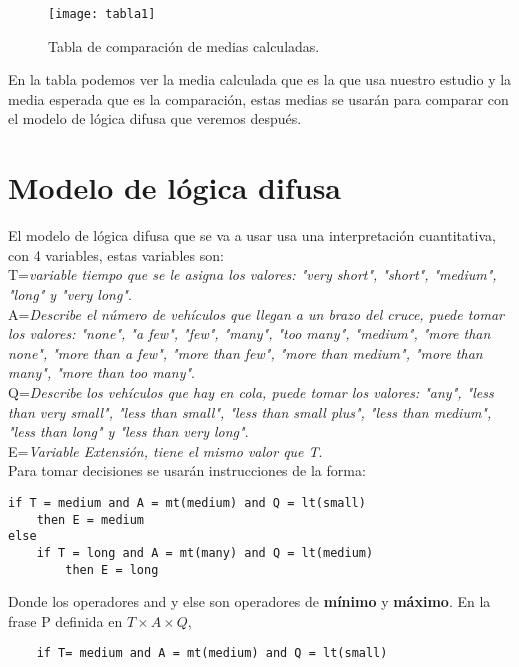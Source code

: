 \begin{figure}[H]
	\texttt{[image: tabla1]}
	\centering
	\caption{Tabla de comparación de medias calculadas.}
	\label{fig:mesh1}
\end{figure}

En la tabla podemos ver la media calculada que es la que usa nuestro estudio y la media esperada que es la comparación, estas medias se usarán para comparar con el modelo de lógica difusa que veremos después.\\

\newpage
\section{Modelo de lógica difusa}

El modelo de lógica difusa que se va a usar usa una interpretación cuantitativa, con 4 variables, estas variables son:\\

T=\textit{variable tiempo que se le asigna los valores: "very short", "short", "medium", "long" y "very long"}.\\

A=\textit{Describe el número de vehículos que llegan a un brazo del cruce, puede tomar los valores: "none", "{a few}", "few", "many", "too many", "medium", "more than none", "more than a few", "more than few", "more than medium", "more than many", "more than too many"}.\\

Q=\textit{Describe los vehículos que hay en cola, puede tomar los valores: "{any}", "less than very small", "less than small", "less than small plus", "less than medium", "less than long" y "less than very long"}.\\

E=\textit{Variable Extensión, tiene el mismo valor que T}.\\

Para tomar decisiones se usarán instrucciones de la forma:
\begin{lstlisting}
if T = medium and A = mt(medium) and Q = lt(small)
	then E = medium
else
	if T = long and A = mt(many) and Q = lt(medium)
		then E = long
\end{lstlisting}

Donde los operadores and y else son operadores de \textbf{mínimo} y \textbf{máximo}.
En la frase P definida en $T \times A \times Q$,
\begin{lstlisting}
	if T= medium and A = mt(medium) and Q = lt(small)
\end{lstlisting}

